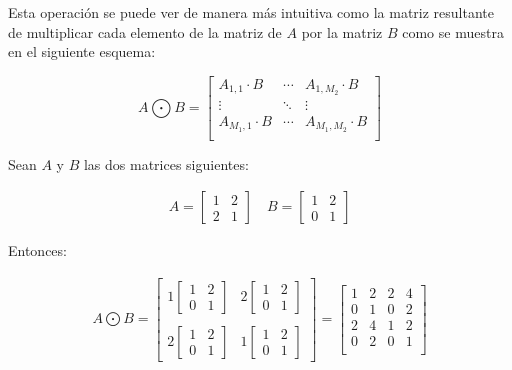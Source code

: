 Esta operación se puede ver de manera más intuitiva como la matriz resultante de multiplicar cada elemento de la matriz de $A$ por la matriz $B$ como se muestra en el siguiente esquema:

\begin{equation} \label{eq:kroneckersencillo}
A \bigodot B = 
\begin{bmatrix}
A_{1,1} \cdot B & \cdots  & A_{1,M_2} \cdot B \\
\vdots & \ddots & \vdots\\
A_{M_1,1} \cdot B & \cdots  & A_{M_1,M_2} \cdot B \\
\end{bmatrix}
\end{equation}

\begin{ejemplo}
Sean $A$ y $B$ las dos matrices siguientes:

\begin{align*}
A = \begin{bmatrix}
1 & 2 \\
2 & 1 
\end{bmatrix} \quad 
B = \begin{bmatrix}
1 & 2\\
0 & 1 
\end{bmatrix}
\end{align*}

Entonces:

\begin{align*}
A \bigodot B = \begin{bmatrix}
1\begin{bmatrix}
1 & 2\\
0 & 1 
\end{bmatrix} & 2\begin{bmatrix}
1 & 2\\
0 & 1 
\end{bmatrix}\\ \\
2\begin{bmatrix}
1 & 2\\
0 & 1 
\end{bmatrix} & 1\begin{bmatrix}
1 & 2\\
0 & 1 
\end{bmatrix}
\end{bmatrix} =  \begin{bmatrix}
1 & 2 & 2 & 4\\
0 & 1 & 0 & 2\\
2 & 4 & 1 & 2\\
0 & 2 & 0 & 1\\
\end{bmatrix}
\end{align*}

\end{ejemplo}


